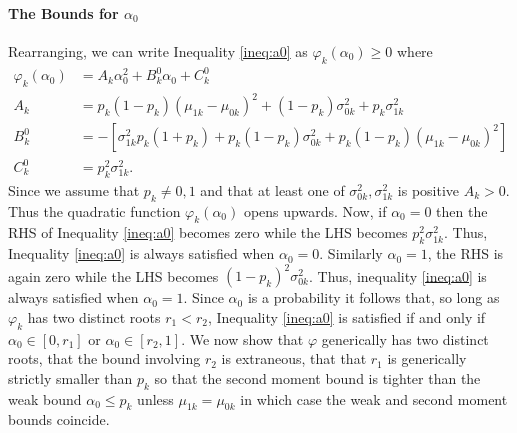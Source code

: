 \documentclass[12pt]{article}
\begin{document}
\paragraph{The Bounds for $\alpha_0$}
Rearranging, we can write Inequality \ref{ineq:a0} as $\varphi_k(\alpha_0) \geq 0$ where
\begin{align*}
  \varphi_k(\alpha_0) &= A_k \alpha_0^2 + B^0_k \alpha_0 + C^0_k \\
  A_k &= p_k (1 - p_k)(\mu_{1k} - \mu_{0k})^2 + (1 - p_k) \sigma_{0k}^2 + p_k \sigma_{1k}^2\\
  B_k^0 &= - \left[ \sigma_{1k}^2 p_k(1 + p_k) + p_k (1 - p_k)\sigma_{0k}^2 + p_k (1 - p_k)(\mu_{1k} - \mu_{0k})^2 \right]\\
  C_k^0 &= p_k^2 \sigma_{1k}^2. 
\end{align*}
Since we assume that $p_k \neq 0,1$ and that at least one of $\sigma_{0k}^2,\sigma^2_{1k}$ is positive $A_k > 0$.
Thus the quadratic function $\varphi_k(\alpha_0)$ opens upwards.
Now, if $\alpha_0 = 0$ then the RHS of Inequality \ref{ineq:a0} becomes zero while the LHS becomes $p_k^2 \sigma_{1k}^2$.
Thus, Inequality \ref{ineq:a0} is always satisfied when $\alpha_0 = 0$.
Similarly $\alpha_0 = 1$, the RHS is again zero while the LHS becomes $(1 - p_k)^2\sigma_{0k}^2$.
Thus, inequality \ref{ineq:a0} is always satisfied when $\alpha_0 = 1$.
Since $\alpha_0$ is a probability it follows that, so long as $\varphi_k$ has two distinct roots $r_1 < r_2$, Inequality \ref{ineq:a0} is satisfied if and only if $\alpha_0 \in [0, r_1]$ or $\alpha_0 \in [r_2, 1]$.
We now show that $\varphi$ generically has two distinct roots, that the bound involving $r_2$ is extraneous, that that $r_1$ is generically strictly smaller than $p_k$ so that the second moment bound is tighter than the weak bound $\alpha_0 \leq p_k$ unless $\mu_{1k} = \mu_{0k}$ in which case the weak and second moment bounds coincide.
\end{document}
